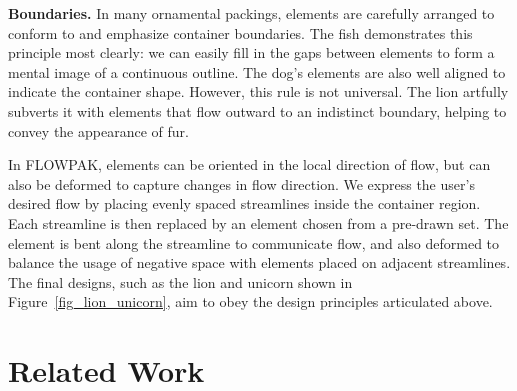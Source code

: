 \begin{items}
\item \textbf{Boundaries.} In many ornamental packings, elements are
  carefully arranged to conform to and emphasize container boundaries.
  The fish demonstrates this principle most clearly: we can easily
  fill in the gaps between elements to form a mental image of a continuous
  outline.  The dog's elements are also well aligned to indicate the
  container shape.  However, this rule is not universal.  
  The lion artfully subverts it with elements that flow outward to an
  indistinct boundary, helping to convey the appearance of fur.
\end{items}



In FLOWPAK, elements can be oriented in the local direction 
of flow, but can also be deformed to capture changes in flow direction.
We express the user's desired flow by placing evenly spaced streamlines
inside the container region.  Each streamline is then replaced by an
element chosen from a pre-drawn set.  The element is bent along the streamline
to communicate flow, and also deformed to balance the usage of negative space
with elements placed on adjacent streamlines.  The final designs, such
as the lion and unicorn shown in Figure~\ref{fig_lion_unicorn}, aim to obey the
design principles articulated above.




\section{Related Work}
\label{flowpak_previous_work}


